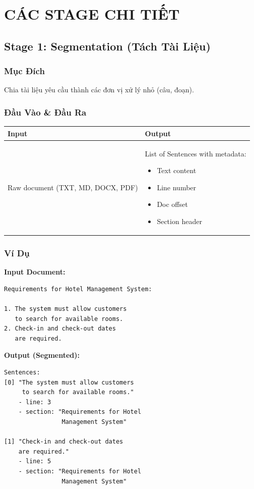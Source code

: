 \documentclass[12pt, a4paper]{report}
\begin{document}
\newpage

\chapter{CÁC STAGE CHI TIẾT}

\section{Stage 1: Segmentation (Tách Tài Liệu)}

\subsection{Mục Đích}

Chia tài liệu yêu cầu thành các đơn vị xử lý nhỏ (câu, đoạn).

\subsection{Đầu Vào \& Đầu Ra}

\begin{table}[h]
\centering
\begin{tabular}{|p{3cm}|p{6cm}|}
\hline
\textbf{Input} & \textbf{Output} \\
\hline
Raw document (TXT, MD, DOCX, PDF) & 
List of Sentences with metadata:
\begin{itemize}
\item Text content
\item Line number
\item Doc offset
\item Section header
\end{itemize} \\
\hline
\end{tabular}
\end{table}

\subsection{Ví Dụ}

\begin{tcolorbox}[colback=cyan!5]
\textbf{Input Document:}
\begin{lstlisting}
Requirements for Hotel Management System:

1. The system must allow customers 
   to search for available rooms.
2. Check-in and check-out dates 
   are required.
\end{lstlisting}

\textbf{Output (Segmented):}
\begin{lstlisting}
Sentences:
[0] "The system must allow customers 
     to search for available rooms."
    - line: 3
    - section: "Requirements for Hotel 
                Management System"
    
[1] "Check-in and check-out dates 
    are required."
    - line: 5
    - section: "Requirements for Hotel 
                Management System"
\end{lstlisting}
\end{tcolorbox}
\end{document}
